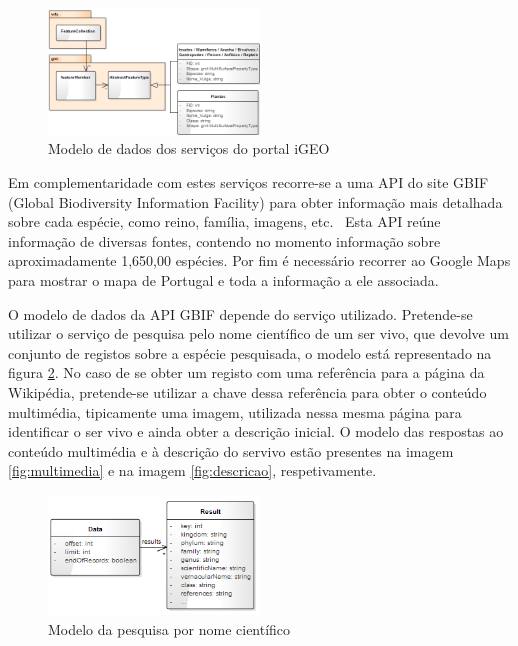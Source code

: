 \documentclass[twocolumn,twoside,11pt,a4paper]{article}
\begin{document}
\begin{figure}[ht!]
	\begin{center}
		\includegraphics[width=0.50\textwidth]{igeo}
		\caption{Modelo de dados dos serviços do portal iGEO}
		\label{fig:igeo}
	\end{center}
\end{figure} 


Em complementaridade com estes serviços recorre-se a uma API do site GBIF (Global Biodiversity Information Facility) para obter informação mais detalhada sobre cada espécie, como reino, família, imagens, etc.~\cite{gbif} Esta API reúne informação de diversas fontes, contendo no momento informação sobre aproximadamente 1,650,00 espécies. Por fim é necessário recorrer ao Google Maps para mostrar o mapa de Portugal e toda a informação a ele associada.~\cite{googlemaps}

	O modelo de dados da API GBIF depende do serviço utilizado. Pretende-se utilizar o serviço de pesquisa pelo nome científico de um ser vivo, que devolve um conjunto de registos sobre a espécie pesquisada, o modelo está representado na figura  \ref{fig:scientName}. No caso de se obter um registo com uma referência para a página da Wikipédia, pretende-se utilizar a chave dessa referência para obter o conteúdo multimédia, tipicamente uma imagem, utilizada nessa mesma página para identificar o ser vivo e ainda obter a descrição inicial. O modelo das respostas ao conteúdo multimédia e à descrição do servivo estão presentes na imagem \ref{fig:multimedia} e na imagem \ref{fig:descricao}, respetivamente.

\begin{figure}[ht!]
	\begin{center}
		\includegraphics[width=0.50\textwidth]{Scientify_name}
		\caption{Modelo da pesquisa por nome científico}
		\label{fig:scientName}
	\end{center}
\end{figure} 
\end{document}
